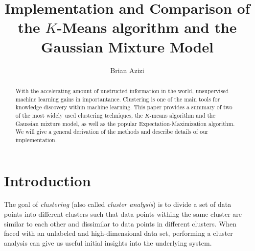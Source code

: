 \documentclass[final,3p,times,twocolumn]{elsarticle}
\begin{document}
\begin{frontmatter}



\title{Implementation and Comparison of the $K$-Means algorithm and the Gaussian Mixture Model}


\author{Brian Azizi}

\address{Cavendish Laboratory, Department of Physics, J J Thomson
  Avenue, Cambridge. CB3 0HE}

\begin{abstract}
With the accelerating amount of unstructed information in the world, unsupervised machine learning gains in importantance.
Clustering is one of the main tools for knowledge discovery within machine learning.
This paper provides a summary of two of the most widely used clustering techniques, the $K$-means algorithm and the Gaussian mixture model, as well as the popular Expectation-Maximization algorithm.
We will give a general derivation of the methods and describe details of our implementation.
\end{abstract}

\end{frontmatter}


\section{Introduction}
\label{sect:Intro}
The goal of \emph{clustering} (also called \emph{cluster analysis}) is to divide a set of data points into different clusters such that data points withing the same cluster are similar to each other and dissimilar to data points in different clusters. 
When faced with an unlabeled and high-dimensional data set, performing a cluster analysis can give us useful initial insights into the underlying system.
\end{document}
